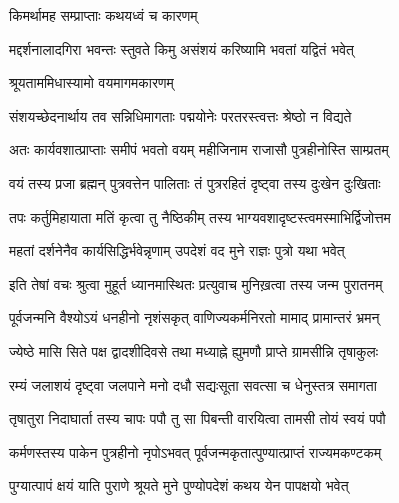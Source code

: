 
\onelineshloka
{किमर्थामह सम्प्राप्ताः कथयध्वं च कारणम्} %

\twolineshloka
{मद्दर्शनालादगिरा भवन्तः स्तुवते किमु}
{असंशयं करिष्यामि भवतां यद्वितं भवेत्} %



\onelineshloka
{श्रूयताममिधास्यामो वयमागमकारणम्} %

\twolineshloka
{संशयच्छेदनार्थाय तव सन्निधिमागताः}
{पद्मयोनेः परतरस्त्वत्तः श्रेष्ठो न विद्यते} %

\twolineshloka
{अतः कार्यवशात्प्राप्ताः समीपं भवतो वयम्}
{महीजिनाम राजासौ पुत्रहीनोस्ति साम्प्रतम्} %

\twolineshloka
{वयं तस्य प्रजा ब्रह्मन् पुत्रवत्तेन पालिताः}
{तं पुत्ररहितं दृष्ट्वा तस्य दुःखेन दुःखिताः} %

\twolineshloka
{तपः कर्तुमिहायाता मतिं कृत्वा तु नैष्ठिकीम्}
{तस्य भाग्यवशादृष्टस्त्वमस्माभिर्द्विजोत्तम} %

\twolineshloka
{महतां दर्शनेनैव कार्यसिद्धिर्भवेन्नृणाम्}
{उपदेशं वद मुने राज्ञः पुत्रो यथा भवेत्} %

\twolineshloka
{इति तेषां वचः श्रुत्वा मुहूर्त ध्यानमास्थितः}
{प्रत्युवाच मुनिख़त्वा तस्य जन्म पुरातनम्} %


\twolineshloka
{पूर्वजन्मनि वैश्योऽयं धनहीनो नृशंसकृत्}
{वाणिज्यकर्मनिरतो मामाद् प्रामान्तरं भ्रमन्} %

\twolineshloka
{ज्येष्ठे मासि सिते पक्ष द्वादशीदिवसे तथा}
{मध्याह्ने ह्युमणौ प्राप्ते ग्रामसीन्नि तृषाकुलः} %

\twolineshloka
{रम्यं जलाशयं दृष्ट्वा जलपाने मनो दधौ}
{सद्यःसूता सवत्सा च धेनुस्तत्र समागता} %

\twolineshloka
{तृषातुरा निदाघार्ता तस्य चापः पपौ तु सा}
{पिबन्ती वारयित्वा तामसी तोयं स्वयं पपौ} %

\twolineshloka
{कर्मणस्तस्य पाकेन पुत्रहीनो नृपोऽभवत्}
{पूर्वजन्मकृतात्पुण्यात्प्राप्तं राज्यमकण्टकम्} %



\twolineshloka
{पुग्यात्पापं क्षयं याति पुराणे श्रूयते मुने}
{पुण्योपदेशं कथय येन पापक्षयो भवेत्} %



